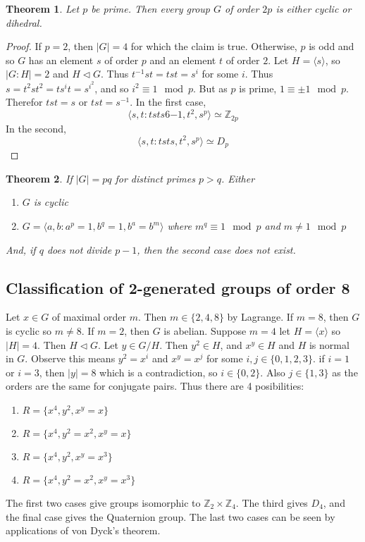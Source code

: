 \documentclass[a4paper,10pt]{article}
\newcommand{\ZZ}{\mathbb{Z}}
\newtheorem{thm}{Theorem}
\begin{document}
\begin{thm}
Let $p$ be prime. Then every group $G$ of order $2p$ is either cyclic or dihedral. 
\end{thm}

\begin{proof}
If $p = 2$, then $|G| = 4$ for which the claim is true. Otherwise, $p$ is odd and so $G$ has an element $s$ of order $p$ and an element $t$ of order $2$. Let $H = \langle s \rangle$, so $|G:H| = 2$ and $H \triangleleft G$. Thus $t^{-1} s t = tst = s^i$ for some $i$. Thus $s = t^2 s t^2 = t s^i t = s^{i^2}$, and so $i^2 \equiv 1 \mod p$. But as $p$ is prime, $1 \equiv \pm 1 \mod p$. Therefor $tst = s$ or $tst = s^{-1}$. In the first case, 
\[ \langle s,t : tsts6{-1}, t^2, s^p \rangle \simeq \ZZ_{2p} \]
In the second, 
\[ \langle s,t : tsts, t^2, s^p \rangle \simeq D_p \]
\end{proof}

\begin{thm}
If $|G| = pq$ for distinct primes $p > q$. Either
\begin{enumerate}
\item $G$ is cyclic 
\item $G = \langle a,b : a^p = 1, b^q = 1, b^a = b^m \rangle$ where $m^q \equiv 1 \mod p$ and $m \neq 1 \mod p$
\end{enumerate}
And, if $q$ does not divide $p - 1$, then the second case does not exist. 
\end{thm}


\subsection{Classification of 2-generated groups of order 8}
Let $x \in G$ of maximal order $m$. Then $m \in \{ 2,4,8 \}$ by Lagrange. If $m = 8$, then $G$ is cyclic so $m \neq 8$. If $m = 2$, then $G$ is abelian. Suppose $m = 4$ let $H = \langle x \rangle$ so $|H| = 4$. Then $H \triangleleft G$. Let $y \in G / H$. Then $y^2 \in H$, and $x^y \in H$ and $H$ is normal in $G$. Observe this means $y^2 = x^i$ and $x^y = x^j$ for some $i,j \in \{0,1,2,3\}$. if $i = 1$ or $i = 3$, then $|y| = 8$ which is a contradiction, so $i \in \{0,2\}$. Also $j \in \{1,3\}$ as the orders are the same for conjugate pairs. Thus there are 4 posibilities:
\begin{enumerate}
\item $R = \{ x^4, y^2, x^y = x\}$ 
\item $R = \{ x^4, y^2 = x^2, x^y = x\}$ 
\item $R = \{ x^4, y^2, x^y = x^3\}$ 
\item $R = \{ x^4, y^2 = x^2, x^y = x^3\}$ 
\end{enumerate}
The first two cases give groups isomorphic to $\ZZ_2 \times \ZZ_4$. The third gives $D_4$, and the final case gives the Quaternion group. The last two cases can be seen by applications of von Dyck's theorem. 
 
\end{document}
